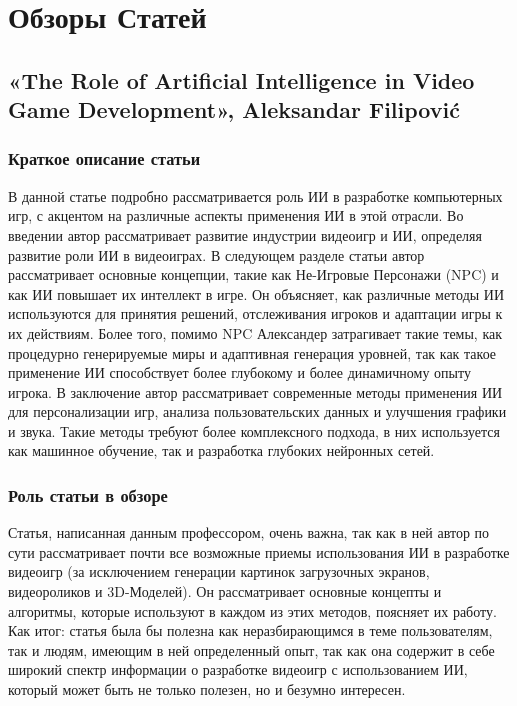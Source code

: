 \documentclass[14pt]{article}
\begin{document}
\section{Обзоры Статей}
\label{sec:headings}

\subsection{«The Role of Artificial Intelligence in Video Game Development», Aleksandar Filipović}
\subsubsection{Краткое описание статьи}
В данной статье подробно рассматривается роль ИИ в разработке компьютерных игр, с акцентом на различные аспекты применения ИИ в этой отрасли. Во введении автор рассматривает развитие индустрии видеоигр и ИИ, определяя развитие роли ИИ в видеоиграх. В следующем разделе статьи автор рассматривает основные концепции, такие как Не-Игровые Персонажи (NPC) и как ИИ повышает их интеллект в игре. Он объясняет, как различные методы ИИ используются для принятия решений, отслеживания игроков и адаптации игры к их действиям. Более того, помимо NPC Александер затрагивает такие темы, как процедурно генерируемые миры и адаптивная генерация уровней, так как такое применение ИИ способствует более глубокому и более динамичному опыту игрока. В заключение автор рассматривает современные методы применения ИИ для персонализации игр, анализа пользовательских данных и улучшения графики и звука. Такие методы требуют более комплексного подхода, в них используется как машинное обучение, так и разработка глубоких нейронных сетей.

\subsubsection{Роль статьи в обзоре}
 Статья, написанная данным профессором, очень важна, так как в ней автор по сути рассматривает почти все возможные приемы использования ИИ в разработке видеоигр (за исключением генерации картинок загрузочных экранов, видеороликов и 3D-Моделей). Он рассматривает основные концепты и алгоритмы, которые используют в каждом из этих методов, поясняет их работу. Как итог: статья была бы полезна как неразбирающимся в теме пользователям, так и людям, имеющим в ней определенный опыт, так как она содержит в себе широкий спектр информации о разработке видеоигр с использованием ИИ, который может быть не только полезен, но и безумно интересен.
\end{document}
